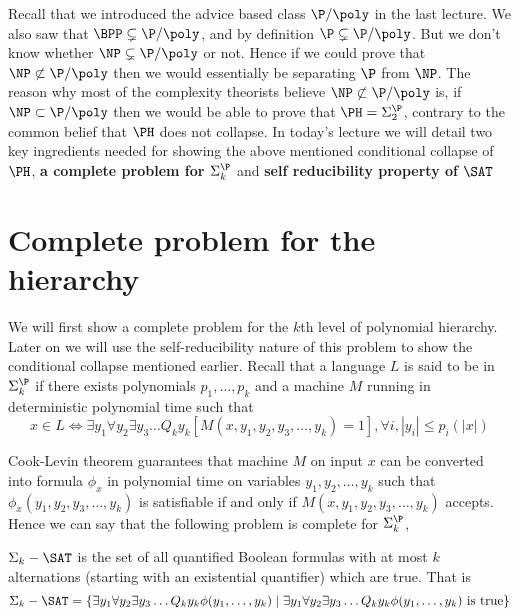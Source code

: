 Recall that we introduced the advice based class $\P/\poly$
in the last lecture. We also saw that $\BPP \subsetneq \P/\poly$, and
by definition $\P \subsetneq \P/\poly$. But we don't know whether
$\NP\subsetneq \P/\poly$ or not. Hence if we could prove that $\NP
\not\subset \P/\poly$ then we would essentially be separating $\P$
from $\NP$. The reason why most of the complexity theorists believe $\NP
\not\subset \P/\poly$ is, if $\NP \subset \P/\poly$ then we would be
able to prove that $\PH=\Sigma_2^\P$, contrary to the common belief
that $\PH$ does not collapse. In today's lecture we will detail two
key ingredients needed for showing the above mentioned conditional
collapse of $\PH$, \textbf{a complete problem for $\Sigma_k^\P$} and
\textbf{self reducibility property of $\SAT$}

\section{Complete problem for the hierarchy}

We will first show a complete problem for the $k$th level of
polynomial hierarchy. Later on we will use the self-reducibility
nature of this problem to show the conditional collapse mentioned
earlier. Recall that a language $L$ is said to be in $\Sigma_k^\P$ 
if there exists polynomials $p_1,\dots,p_k$ and a machine $M$ running
in deterministic polynomial time such that
\begin{displaymath}
  x \in L \iff \exists y_1 \forall y_2 \exists y_3 \dots Q_k y_k
  \left[ M(x,y_1,y_2,y_3,\dots,y_k) = 1\right] , \forall i,|y_i|\leq p_i(|x|)
\end{displaymath}

Cook-Levin theorem guarantees that machine $M$ on input $x$ can be
converted into formula $\phi_x$ in polynomial time on variables
$y_1,y_2,\dots,y_k$ such that $\phi_x(y_1,y_2,y_3,\dots,y_k)$ is
satisfiable if and only if $M(x,y_1,y_2,y_3,\dots,y_k)$ accepts. Hence
we can say that the following problem is complete for $\Sigma_k^\P$,
\begin{definition} 
$\Sigma_k-\SAT$ is the set of all quantified Boolean formulas with at
most $k$ alternations (starting with an existential quantifier) which
are true. That is
\begin{displaymath}
  \Sigma_k-\SAT = \left\{ \exists y_1 \forall y_2 \exists y_3 \dots Q_k y_k
  \phi(y_1,\dots,y_k) \mid \exists y_1 \forall y_2 \exists y_3 \dots Q_k y_k
  \phi(y_1,\dots,y_k) \text{ is true} \right\}
\end{displaymath}
\end{definition}

